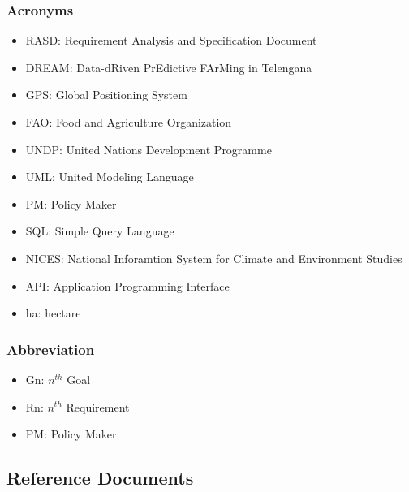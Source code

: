 \subsubsection{Acronyms}
\begin{itemize}
	\item RASD: Requirement Analysis and Specification Document
	\item DREAM: Data-dRiven PrEdictive FArMing in
Telengana
	\item GPS: Global Positioning System
	\item FAO: Food and Agriculture Organization
	\item UNDP: United Nations Development Programme
	\item UML: United Modeling Language
	\item PM: Policy Maker
	\item SQL: Simple Query Language
	\item NICES: National Inforamtion System for Climate and Environment Studies
	\item API: Application Programming Interface
	\item ha: hectare
\end{itemize}

\subsubsection{Abbreviation}
\begin{itemize}
	\item Gn: $n^{th}$ Goal
	\item Rn: $n^{th}$ Requirement
	\item PM: Policy Maker
\end{itemize}

\subsection{Reference Documents}
 

